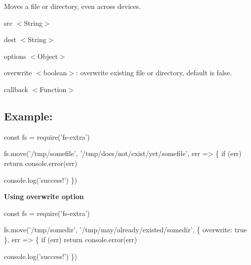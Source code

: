 Moves a file or directory, even across devices.


\begin{DoxyItemize}
\item {\ttfamily src} {\ttfamily $<$String$>$}
\item {\ttfamily dest} {\ttfamily $<$String$>$}
\item {\ttfamily options} {\ttfamily $<$Object$>$}
\begin{DoxyItemize}
\item {\ttfamily overwrite} {\ttfamily $<$boolean$>$}\+: overwrite existing file or directory, default is {\ttfamily false}.
\end{DoxyItemize}
\item {\ttfamily callback} {\ttfamily $<$Function$>$}
\end{DoxyItemize}

\subsection*{Example\+:}


\begin{DoxyCode}
const fs = require('fs-extra')

fs.move('/tmp/somefile', '/tmp/does/not/exist/yet/somefile', err => \{
  if (err) return console.error(err)

  console.log('success!')
\})
\end{DoxyCode}


{\bfseries Using {\ttfamily overwrite} option}


\begin{DoxyCode}
const fs = require('fs-extra')

fs.move('/tmp/somedir', '/tmp/may/already/existed/somedir', \{ overwrite: true \}, err => \{
  if (err) return console.error(err)

  console.log('success!')
\})
\end{DoxyCode}
 